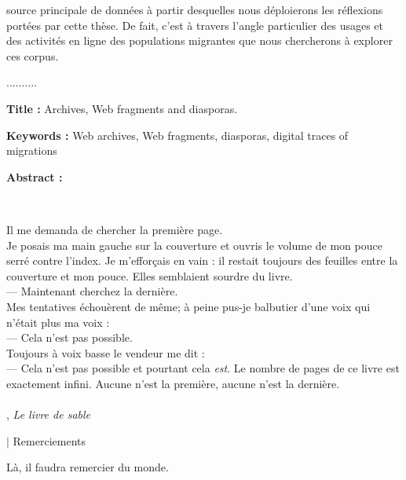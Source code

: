 \documentclass[symmetric,justified,marginals=raggedouter]{tufte-book}
\begin{document}
\begin{fullwidth}
source principale de données à partir desquelles nous déploierons les réflexions portées par cette thèse. De fait, c'est à travers l'angle particulier des usages et des activités en ligne des populations migrantes que nous chercherons à explorer ces corpus.

..........

\vfill

\noindent\textbf{Title :} Archives, Web fragments and diasporas.

\noindent\textbf{Keywords :} Web archives, Web fragments, diasporas, digital traces of migrations 

\noindent\textbf{Abstract :}


\end{fullwidth}
  
\thispagestyle{empty}%
\clearpage%


\newpage

~\vfill
\noindent
\par\noindent \og Il me demanda de chercher la première page.\\
\noindent Je posais ma main gauche sur la couverture et ouvris le volume de mon pouce serré contre l'index. Je m'efforçais en vain : il restait toujours des feuilles entre la couverture et mon pouce. Elles semblaient sourdre du livre.\\
--- Maintenant cherchez la dernière.\\
\noindent Mes tentatives échouèrent de même; à peine pus-je balbutier d'une voix qui n'était plus ma voix :\\
--- Cela n'est pas possible.\\
\noindent Toujours à voix basse le vendeur me dit : \\
--- Cela n'est pas possible et pourtant cela \textit{est}. Le nombre de pages de ce livre est exactement infini. Aucune n'est la première, aucune n'est la dernière. \fg
\\~\\
\noindent {}, \textit{Le livre de sable} 
\vfill
\indent


\newpage
\begingroup
\vspace*{8em}
\huge $\vert$ \huge Remerciements
\vspace*{4em}
\par\normalsize Là, il faudra remercier du monde.
\endgroup
\vfill
\end{document}
